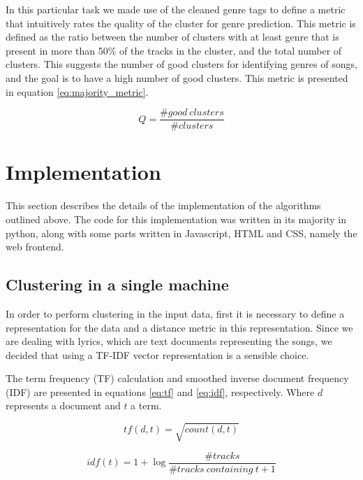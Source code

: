 \documentclass[10pt,a4paper]{scrartcl}
\begin{document}
      In this particular task we made use of the cleaned genre tags to define a
      metric that intuitively rates the quality of the cluster for genre       
      prediction. This metric is defined as the ratio between the number of
      clusters with at least genre that is present in more than 50\% of the
      tracks in the cluster, and the total number of clusters. This
      suggests the number of good clusters for identifying genres of
      songs, and the goal is to have a high number of good clusters.
      This metric is presented in equation \ref{eq:majority_metric}.
      
      \begin{equation}
        \label{eq:majority_metric}
        Q = \frac{\#good\ clusters}{\#clusters}
      \end{equation}
      
  \section{Implementation}
    This section describes the details of the implementation of the algorithms
    outlined above. The code for this implementation was written in its majority
    in python, along with some parts written in Javascript, HTML and CSS,
    namely the web frontend.

    \subsection{Clustering in a single machine}
      In order to perform clustering in the input data, first it is necessary to
      define a representation for the data and a distance metric in this
      representation. Since we are dealing with lyrics, which are text documents
      representing the songs, we decided that using a TF-IDF vector
      representation is a sensible choice.
      
      The term frequency (TF) calculation and smoothed inverse document frequency
      (IDF) are presented in equations \ref{eq:tf} and \ref{eq:idf},
      respectively. Where $d$ represents a document and $t$ a term.
      
      \begin{equation}
        \label{eq:tf}
        tf(d, t) = \sqrt{count(d, t)}
      \end{equation}
     
      \begin{equation}
        \label{eq:idf}
        idf(t) = 1 + \log{\frac{\#tracks}{\#tracks\ containing\ t + 1}}
      \end{equation}
      
\end{document}

